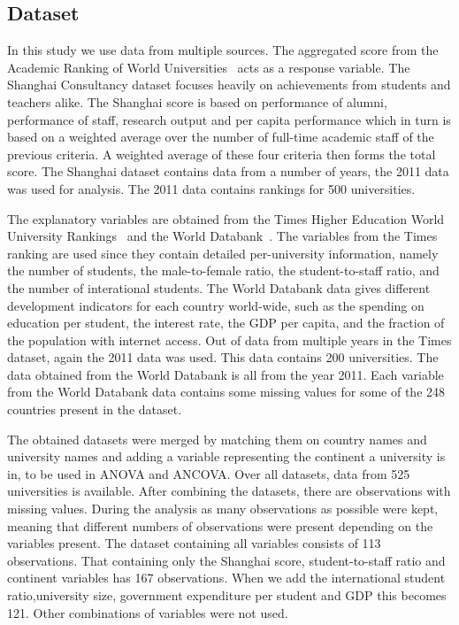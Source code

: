 \documentclass{stats_apa_style2}
\begin{document}
\subsection*{Dataset} 
\label{Dataset}

In this study we use data from multiple sources. The aggregated score from the
Academic Ranking of World Universities~\cite{shanghaidata} acts as a response
variable. The Shanghai Consultancy dataset focuses heavily on achievements from
students and teachers alike.
The Shanghai score is based on performance of alumni, performance of staff,
research output and per capita performance which in turn is based on a weighted
average over the number of full-time academic staff of the previous criteria. A
weighted average of these four criteria then forms the total score. 
The Shanghai dataset contains data from a number of years, the 2011 data was
used for analysis. The 2011 data contains rankings for 500 universities. 

The explanatory variables are obtained from the Times Higher Education World
University Rankings~\cite{timesdata} and the World Databank~\cite{worldbank}.
The variables from the Times ranking are used since they contain detailed
per-university information, namely the number of students, the male-to-female ratio, the student-to-staff ratio, and the number of interational students. The World Databank data gives different development
indicators for each country world-wide, such as the spending on education per student, the interest rate, the GDP per capita, and the fraction of the population with internet access. 
Out of data from multiple years in the Times dataset, again the 2011 data was 
used. This data contains 200 universities. The data obtained from the World
Databank is all from the year 2011. Each variable from the World Databank data
contains some missing values for some of the 248 countries present in the
dataset.

The obtained datasets were merged by matching them on country names and
university names and adding a variable representing the continent a university
is in, to be used in ANOVA and ANCOVA. Over all datasets, data from 525
universities is available. After combining the datasets, there are observations with missing
values. During the analysis as many observations as possible were kept, meaning
that different numbers of observations were present depending on the variables
present. The dataset containing all variables consists of 113 observations. That
containing only the Shanghai score, student-to-staff ratio and continent
variables has 167 observations. When we add the international student
ratio,university size, government expenditure per
student and GDP this becomes 121. Other combinations of variables were not used. 
\end{document}
